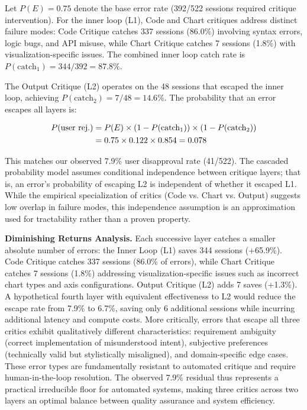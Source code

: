 \documentclass[sigconf]{acmart}
\newcommand{\reviewnote}[1]{}
\newcommand{\reviewnote}[1]{\marginnote{\raggedright\footnotesize\textit{#1}}}
\begin{document}
Let $P(E) = 0.75$ denote the base error rate (392/522 sessions required critique intervention).\reviewnote{Good: directly show the base failure rate. This justifies the multi-layer approach. Consider breaking down what types of errors comprise this 75\%---code bugs, logic errors, data mismatches, etc.} For the inner loop (L1), Code and Chart critiques address distinct failure modes: Code Critique catches 337 sessions (86.0\%) involving syntax errors, logic bugs, and API misuse, while Chart Critique catches 7 sessions (1.8\%) with visualization-specific issues. The combined inner loop catch rate is $P(\text{catch}_1) = 344/392 = 87.8\%$.

The Output Critique (L2) operates on the 48 sessions that escaped the inner loop, achieving $P(\text{catch}_2) = 7/48 = 14.6\%$. The probability that an error escapes all layers is:

\begin{align}
P(\text{user rej.}) &= P(E) \times (1 - P(\text{catch}_1)) \times (1 - P(\text{catch}_2)) \notag \\
&= 0.75 \times 0.122 \times 0.854 = 0.078
\end{align}

This matches our observed 7.9\% user disapproval rate (41/522). The cascaded probability model assumes conditional independence between critique layers; that is, an error's probability of escaping L2 is independent of whether it escaped L1. While the empirical specialization of critics (Code vs. Chart vs. Output) suggests low overlap in failure modes, this independence assumption is an approximation used for tractability rather than a proven property.

\textbf{Diminishing Returns Analysis.}\reviewnote{Strong analysis showing optimality. This is a key contribution---you've identified the practical ceiling for automated verification. Make this even more prominent in the abstract/conclusion.} Each successive layer catches a smaller absolute number of errors: the Inner Loop (L1) saves 344 sessions (+65.9\%). Code Critique catches 337 sessions (86.0\% of errors), while Chart Critique catches 7 sessions (1.8\%) addressing visualization-specific issues such as incorrect chart types and axis configurations. Output Critique (L2) adds 7 saves (+1.3\%). A hypothetical fourth layer with equivalent effectiveness to L2 would reduce the escape rate from 7.9\% to 6.7\%, saving only 6 additional sessions while incurring additional latency and compute costs. More critically, errors that escape all three critics exhibit qualitatively different characteristics: requirement ambiguity (correct implementation of misunderstood intent), subjective preferences (technically valid but stylistically misaligned), and domain-specific edge cases. These error types are fundamentally resistant to automated critique and require human-in-the-loop resolution. The observed 7.9\% residual thus represents a practical irreducible floor for automated systems, making three critics across two layers an optimal balance between quality assurance and system efficiency.
\end{document}
